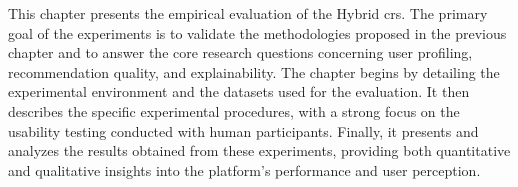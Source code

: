 This chapter presents the empirical evaluation of the Hybrid \acl{crs}. The primary goal of the experiments is to validate the methodologies proposed in the previous chapter and to answer the core research questions concerning user profiling, recommendation quality, and explainability. The chapter begins by detailing the experimental environment and the datasets used for the evaluation. It then describes the specific experimental procedures, with a strong focus on the usability testing conducted with human participants. Finally, it presents and analyzes the results obtained from these experiments, providing both quantitative and qualitative insights into the platform's performance and user perception.